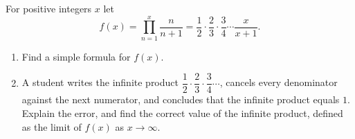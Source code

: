 For positive integers $x$ let
\[f(x)=\prod_{n=1}^{x}\dfrac{n}{n+1}=\dfrac12\cdot\dfrac23\cdot\dfrac34\cdots\dfrac{x}{x+1}.\]
\begin{enumerate}
\item[(a)] Find a simple formula for $f(x)$.
\item[(b)] A student writes the infinite product $\dfrac12\cdot\dfrac23\cdot\dfrac34\cdots$, cancels every denominator against the next numerator, and concludes that the infinite product equals $1$. Explain the error, and find the correct value of the infinite product, defined as the limit of $f(x)$ as $x\to\infty$.
\end{enumerate}
